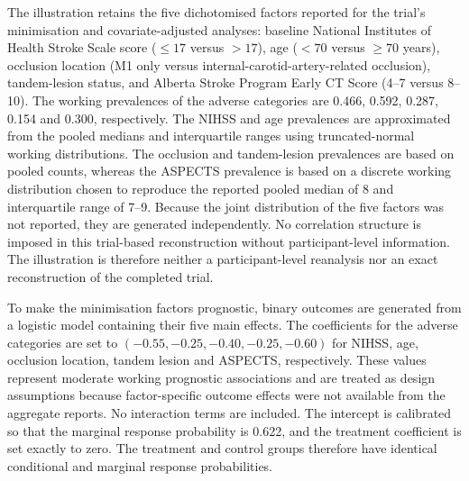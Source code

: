 \documentclass[12pt,a4paper]{article}
\theoremstyle{definition}
\theoremstyle{remark}\newtheorem{remark}{Remark}
\numberwithin{equation}{section}
\begin{document}
The illustration retains the five dichotomised factors reported for the trial's minimisation and covariate-adjusted analyses: baseline National Institutes of Health Stroke Scale score ($\le17$ versus $>17$), age ($<70$ versus $\ge70$ years), occlusion location (M1 only versus internal-carotid-artery-related occlusion), tandem-lesion status, and Alberta Stroke Program Early CT Score (4--7 versus 8--10). The working prevalences of the adverse categories are 0.466, 0.592, 0.287, 0.154 and 0.300, respectively. The NIHSS and age prevalences are approximated from the pooled medians and interquartile ranges using truncated-normal working distributions. The occlusion and tandem-lesion prevalences are based on pooled counts, whereas the ASPECTS prevalence is based on a discrete working distribution chosen to reproduce the reported pooled median of 8 and interquartile range of 7--9. Because the joint distribution of the five factors was not reported, they are generated independently. No correlation structure is imposed in this trial-based reconstruction without participant-level information. The illustration is therefore neither a participant-level reanalysis nor an exact reconstruction of the completed trial.

To make the minimisation factors prognostic, binary outcomes are generated from a logistic model containing their five main effects. The coefficients for the adverse categories are set to $(-0.55,-0.25,-0.40,-0.25,-0.60)$ for NIHSS, age, occlusion location, tandem lesion and ASPECTS, respectively. These values represent moderate working prognostic associations and are treated as design assumptions because factor-specific outcome effects were not available from the aggregate reports. No interaction terms are included. The intercept is calibrated so that the marginal response probability is 0.622, and the treatment coefficient is set exactly to zero. The treatment and control groups therefore have identical conditional and marginal response probabilities.
\end{document}
